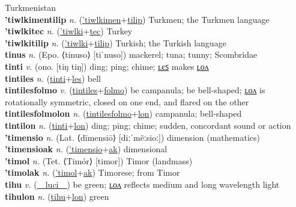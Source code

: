 Turkmenistan \label{'tiwlkimentec} \\
\textbf{'tiwlkimentilip} \textit{n.} (\hyperref['tiwlkimen]{'tiwlkimen}+\hyperref[tilip]{tilip})
Turkmen; the Turkmen language \label{'tiwlkimentilip} \\
\textbf{'tiwlkitec} \textit{n.} (\hyperref['tiwlki]{'tiwlki}+\hyperref[tec]{tec})
Turkey \label{'tiwlkitec} \\
\textbf{'tiwlkitilip} \textit{n.} (\hyperref['tiwlki]{'tiwlki}+\hyperref[tilip]{tilip})
Turkish; the Turkish language \label{'tiwlkitilip} \\
\textbf{tinus} \textit{n.} (Epo. ⟨tinuso⟩ [tiˈnuso])
mackerel; tuna; tunny; Scombridae \label{tinus} \\
\textbf{tinti} \textit{v.} (ono. [tiŋ tiŋ])
ding; ping; chime; \hyperref[tintiles]{ʟєꜱ} makes \hyperref[tintilon]{ʟᴏᴧ} \label{tinti} \\
\textbf{tintiles} \textit{n.} (\hyperref[tinti]{tinti}+\hyperref[les]{les})
bell \label{tintiles} \\
\textbf{tintilesfolmo} \textit{v.} (\hyperref[tintiles]{tintiles}+\hyperref[folmo]{folmo})
be campanula; be bell-shaped; \hyperref[tintilesfolmolon]{ʟᴏᴧ} is rotationally symmetric, closed on one end, and flared on the other \label{tintilesfolmo} \\
\textbf{tintilesfolmolon} \textit{n.} (\hyperref[tintilesfolmo]{tintilesfolmo}+\hyperref[lon]{lon})
campanula; bell-shaped \label{tintilesfolmolon} \\
\textbf{tintilon} \textit{n.} (\hyperref[tinti]{tinti}+\hyperref[lon]{lon})
ding; ping; chime; sudden, concordant sound or action \label{tintilon} \\
\textbf{'timensio} \textit{n.} (Lat. ⟨dīmensiō⟩ [diːˈmẽːsioː])
dimension (mathematics) \label{'timensio} \\
\textbf{'timensioak} \textit{n.} (\hyperref['timensio]{'timensio}+\hyperref[ak]{ak})
dimensional \label{'timensioak} \\
\textbf{'timol} \textit{n.} (Tet. ⟨Timór⟩ [timor])
Timor (landmass) \label{'timol} \\
\textbf{'timolak} \textit{n.} (\hyperref['timol]{'timol}+\hyperref[ak]{ak})
Timorese; from Timor \label{'timolak} \\
\textbf{tihu} \textit{v.} (\hyperref[luci]{~~luci~~})
be green; \hyperref[tihulon]{ʟᴏᴧ} reflects medium and long wavelength light \label{tihu} \\
\textbf{tihulon} \textit{n.} (\hyperref[tihu]{tihu}+\hyperref[lon]{lon})
green \label{tihulon} \\

